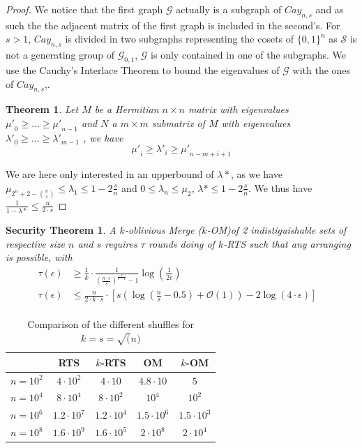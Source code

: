 \documentclass[english,oneside,twocolumn]{article}
\newtheorem{secthm}{Security Theorem}
\newtheorem{theorem}{Theorem}
\begin{document}
\begin{proof}
We notice that the first graph $\mathcal{G}$ actually is a subgraph of $Cay_{n,s}$ and as such the the adjacent matrix of the first graph is included in the second's.
For $s>1$, $Cay_{n,s}$ is divided in two subgraphs representing the cosets of $\{0,1\}^n$ as $\mathcal{S}$ is not a generating group of $\mathcal{G}_{0,1}$, $\mathcal{G}$ is only contained in one of the subgraphs.
We use the Cauchy's Interlace Theorem to bound the eigenvalues of $\mathcal{G}$ with the ones of $Cay_{n,s}$,.

\begin{theorem}
Let $M$ be a Hermitian $n \times n$ matrix with eigenvalues ${\mu'}_0\geq ... \geq {\mu'}_{n-1}$ and $N$ a $m \times m$ submatrix of $M$ with eigenvalues ${\lambda'}_0\geq ... \geq {\lambda'}_{m-1}$ , we have
$$ {\mu'}_i \geq {\lambda'}_i \geq {\mu'}_{n-m+i+1} $$
\end{theorem}

We are here only interested in an upperbound of $\lambda*$, as we have $\mu_{2^n+2-{n \choose s}}\leq \lambda_1\leq 1-2\frac{s}{n}$ and $0 \leq \lambda_n \leq \mu_2$, $\lambda* \leq 1-2\frac{s}{n}$. We thus have $\frac{1}{1-\lambda*}\leq\frac{n}{2\cdot s}$
\end{proof}

\begin{secthm}
A $k$-oblivious Merge ($k$-OM)of 2 indistiguishable sets of respective size $n$ and $s$ requires $\tau$ rounds doing of $k$-RTS such that any arranging is possible, with
\begin{align*}
\tau(\epsilon) &\geq \frac{1}{k}  \cdot \frac{1}{(\frac{n\cdot e}{s})^{\frac{s}{s-1}}-1} \log\left(\frac{1}{2 \epsilon} \right) &\\
\tau(\epsilon) &\leq \frac{n}{2\cdot k \cdot s}  \cdot \left [ s \left( \log \left (\frac{n}{s}-0.5\right) +\mathcal{O}\left(1\right) \right ) - 2\log \left( 4 \cdot \epsilon\right) \right ] &\\
\end{align*}
\end{secthm}

\begin{table}
 \centering
\begin{tabular}{ c|c|c|c|c } 
 & RTS & $k$-RTS & OM & $k$-OM\\ 
 \hline
 $n=10^2$ & $4 \cdot 10^2$ 	& $4 \cdot 10$ 		& $4.8 \cdot 10$ 	& $5$  \\ 
 $n=10^4$ & $8 \cdot 10^4$ 	& $8 \cdot 10^2$ 	& $10^4$ 		& $10^2$  \\ 
 $n=10^6$ & $1.2 \cdot 10^7$ 	& $1.2 \cdot 10^4$ 	& $1.5 \cdot 10^6$ 	& $1.5\cdot 10^3$ \\ 
 $n=10^8$ & $1.6 \cdot 10^9$	& $1.6 \cdot 10^5$	& $2 \cdot 10^8$	& $2 \cdot 10^4$\\
\end{tabular}
\caption{Comparison of the different shuffles for $k=s=\sqrt(n)$}
\end{table}
\end{document}
